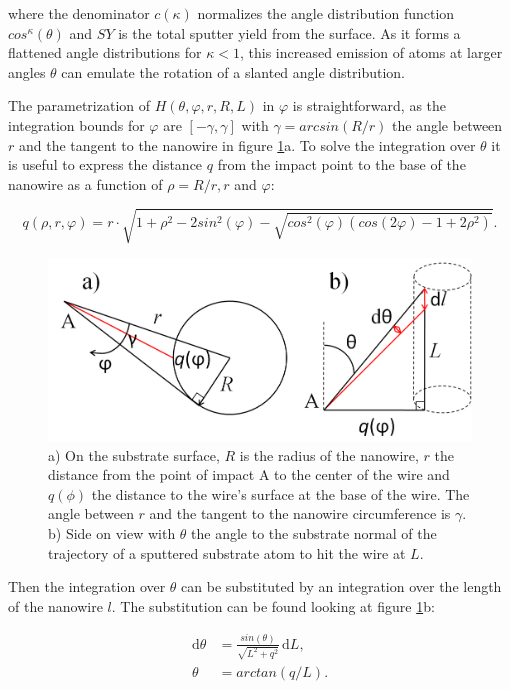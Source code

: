 where the denominator $c(\kappa)$ normalizes the angle distribution function $cos^\kappa(\theta)$ and $SY$ is the total sputter yield from the surface. As it forms a flattened angle distributions for $\kappa < 1$, this increased emission of atoms at larger angles $\theta$ can emulate the rotation of a slanted angle distribution.

The parametrization of $H(\theta,\varphi,r,R,L)$ in $\varphi$ is straightforward, as the integration bounds for $\varphi$ are $[-\gamma, \gamma]$ with $\gamma = arcsin(R/r)$ the angle between $r$ and the tangent to the nanowire in figure \ref{anglesredepo}a. To solve the integration over $\theta$ it is useful to express the distance $q$ from the impact point to the base of the nanowire as a function of $\rho = R/r, r$ and $\varphi$:

\begin{equation}
q(\rho,r,\varphi) = r\cdot \sqrt{1 + \rho^2 - 2sin^2(\varphi) - \sqrt{cos^2(\varphi)(cos(2\varphi) - 1 + 2\rho^2)}}.
\end{equation}

\begin{figure}
	\centering
		\includegraphics[width=.65\textwidth]{images/anglesredeposition.jpg}
	\caption{a) On the substrate surface, $R$ is the radius of the nanowire, $r$ the distance from the point of impact A to the center of the wire and $q(\phi)$ the distance to the wire's surface at the base of the wire. The angle between $r$ and the tangent to the nanowire circumference is $\gamma$. b) Side on view with $\theta$ the angle to the substrate normal of the trajectory of a sputtered substrate atom to hit the wire at $L$.} 
	\label{anglesredepo}
\end{figure} 

Then the integration over $\theta$ can be substituted by an integration over the length of the nanowire $l$. The substitution can be found looking at figure \ref{anglesredepo}b:

\begin{align*}
\mathrm{d}\theta &= \frac{sin(\theta)}{\sqrt{L^2 + q^2}}\,\mathrm{d}L,\\
\theta &= arctan(q/L).
\end{align*}

